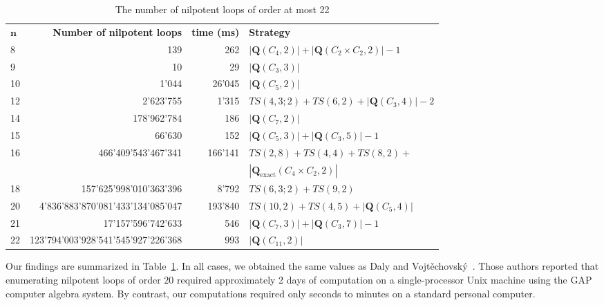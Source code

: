 \documentclass[12pt,a4paper]{amsart}
\theoremstyle{definition}
\newcommand{\boldQ}{\mathbf{Q}}
\newcommand{\boldQexact}{\mathbf{Q}_{\mathrm{exact}}}
\begin{document}
\begin{table}
\caption{The number of nilpotent loops of order at most 22 \label{tab:less-than-24}}
\scriptsize
\begin{tabular}{lrrp{55mm}}
$\mathbf{n}$ & \textbf{Number of nilpotent loops}          & \textbf{time (ms)} & \textbf{Strategy}               \\
8          & 139                                         & 262                     & $|\boldQ(C_4,2)| + |\boldQ(C_2\times C_2,2)| -1$     \\
9          & 10                                          & 29                     & $|\boldQ(C_3,3)|$                       \\
10         & 1'044                                      & 26'045                 & $|\boldQ(C_5,2)|$                      \\
12         & 2'623'755                                 & 1'315                  & $TS(4,3;2)+TS(6,2)+|\boldQ(C_3,4)|-2$ \\
14         & 178'962'784                               & 186                    & $|\boldQ(C_7,2)|$                      \\
15         & 66'630                                     & 152                    & $|\boldQ(C_5,3)|+|\boldQ(C_3,5)|-1$           \\
16         & 466'409'543'467'341                     & 166'141                & $TS(2,8)+TS(4,4)+TS(8,2)+$        \\
&&                                                                            & $|\boldQexact(C_4\times C_2,2)|$ \\
18         & 157'625'998'010'363'396                & 8'792                  & $TS(6,3;2)+TS(9,2)$           \\
20         & 4'836'883'870'081'433'134'085'047    &193'840                & $TS(10,2)+TS(4,5)+|\boldQ(C_5,4)|$  \\
21         & 17'157'596'742'633                      & 546                    & $|\boldQ(C_7,3)|+|\boldQ(C_3,7)|-1$           \\
22         & 123'794'003'928'541'545'927'226'368 & 993                   & $|\boldQ(C_{11},2)|$                     
\end{tabular}
\end{table}

Our findings are summarized in Table~\ref{tab:less-than-24}. In all cases, we obtained the same values as Daly and Vojt\v{e}chovsk\'y~\cite{DalyVojtechovsky2009}. Those authors reported that enumerating nilpotent loops of order $20$ required approximately 2 days of computation on a single-processor Unix machine using the GAP \cite{GAP4} computer algebra system. By contrast, our computations \cite{nagygp2025nilpotentloops} required only seconds to minutes on a standard personal computer. 
\end{document}
